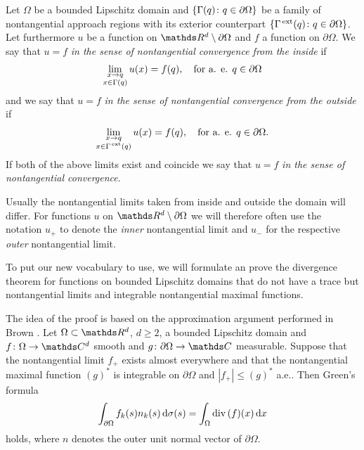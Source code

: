 \begin{defn}
  Let $\Omega$ be a bounded Lipschitz domain and $\{\Gamma(q) \colon q \in \partial\Omega\}$ be a family of nontangential approach regions with its exterior counterpart $\{\Gamma^{\,\mathrm{ext}}(q) \colon q \in \partial\Omega\}$.
  Let furthermore $u$ be a function on $\R^d \setminus \partial\Omega$ and $f$ a function on $\partial\Omega$.
  We say that $u = f$ \emph{in the sense of nontangential convergence from the inside} if 
  \begin{align*}
    \lim_{\substack{ x \to q \\ x \in \Gamma(q)}} u(x) = f(q), \quad\text{for a. e. } q \in \partial\Omega
  \end{align*}
  and we say that $u = f$ \emph{in the sense of nontangential convergence from the outside} if 
  \begin{align*}
    \lim_{\substack{ x \to q \\ x \in \Gamma^{\,\mathrm{ext}}(q)}} u(x) = f(q), \quad\text{for a. e. } q \in \partial\Omega.
  \end{align*}
  If both of the above limits exist and coincide we say that $u = f$ \emph{in the sense of nontangential convergence}.
\end{defn}

Usually the nontangential limits taken from inside and outside the domain will differ.
For functions $u$ on $\R^d \setminus \partial\Omega$ we will therefore often use the notation $u_+$ to denote the \emph{inner} nontangential limit and $u_-$ for the respective \emph{outer} nontangential limit.

To put our new vocabulary to use, we will formulate an prove the divergence theorem for functions on bounded Lipschitz domains that do not have a trace but nontangential limits and integrable nontangential maximal functions.

\begin{prop}
  \label{prop:approximationArgument}
The idea of the proof is based on the approximation argument performed in Brown \cite[Prop. 2.4]{brown}.
  Let $\Omega \subset \R^d$, $d \geq 2$, a bounded Lipschitz domain and $f \colon \Omega \to \C^d$ smooth and $g \colon \partial\Omega \to \C$ measurable.
  Suppose that the nontangential limit $f_+$ exists almost everywhere and that the nontangential maximal function $(g)^*$ is integrable on $\partial\Omega$ and $|f_+| \leq (g)^*$ a.e..
  Then Green's formula
  \begin{align}
    \int_{\partial\Omega} f_k(s) n_k(s) \, {\operatorname{d}\!{\sigma}}(s) = \int_\Omega \mathrm{div\,} (f)(x) \, {\operatorname{d}\!{x}}
  \end{align}
  holds, where $n$ denotes the outer unit normal vector of $\partial\Omega$.
\end{prop}


